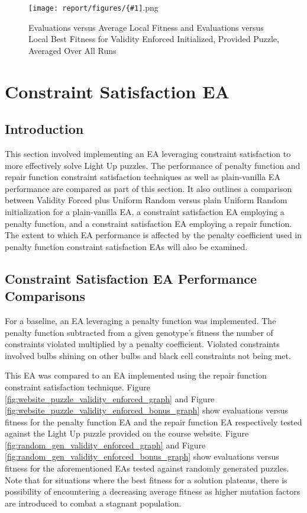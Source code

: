 \documentclass[11pt]{article}
\newcommand{\addgraphic}[1]{\centerline{\texttt{[image: report/figures/\{\#1]}.png}}}
\begin{document}
\begin{figure}[H]
    \addgraphic{website_puzzle_log_graph}
    \caption{Evaluations versus Average Local Fitness and Evaluations versus Local Best Fitness for Validity Enforced Initialized, Provided Puzzle, Averaged Over All Runs}
    \label{fig:std_web_norm}
\end{figure}


\section{Constraint Satisfaction EA}

\subsection{Introduction}

This section involved implementing an EA leveraging constraint satisfaction to
more effectively solve Light Up puzzles. The performance of
penalty function and repair function constraint satisfaction techniques as well as
plain-vanilla EA performance are compared as part of this section. It also outlines a comparison between Validity Forced plus 
Uniform Random versus plain Uniform Random initialization for a plain-vanilla EA,
a constraint satisfaction EA employing a penalty function, and a constraint satisfaction
EA employing a repair function. The extent to which EA performance is affected by 
the penalty coefficient used in penalty function constraint satisfaction EAs will also be examined.


\subsection{Constraint Satisfaction EA Performance Comparisons}

For a baseline, an EA leveraging a penalty function was implemented. The penalty function
subtracted from a given genotype's fitness the number of constraints violated multiplied by a
penalty coefficient. Violated constraints involved bulbs shining on other bulbs and black cell
constraints not being met.

This EA was compared to an EA implemented using the repair function
constraint satisfaction technique. Figure \ref{fig:website_puzzle_validity_enforced_graph} and Figure 
\ref{fig:website_puzzle_validity_enforced_bonus_graph} show evaluations versus fitness for the 
penalty function EA and the repair function EA respectively tested against the Light Up puzzle provided
on the course website. Figure \ref{fig:random_gen_validity_enforced_graph} and Figure \ref{fig:random_gen_validity_enforced_bonus_graph} 
show evaluations versus fitness for the aforementioned EAs tested against randomly generated puzzles. Note that 
for situations where the best fitness for a solution plateaus, there is possibility of encountering a decreasing average fitness
as higher mutation factors are introduced to combat a stagnant population.
\end{document}
